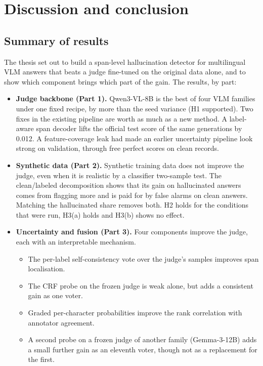 \chapter{Discussion and conclusion}\label{chap:conclusion}

\section{Summary of results}

The thesis set out to build a span-level hallucination detector for multilingual VLM answers that beats a judge fine-tuned on the original data alone, and to show which component brings which part of the gain. The results, by part:

\begin{itemize}
    \item \textbf{Judge backbone (Part 1).} Qwen3-VL-8B is the best of four VLM families under one fixed recipe, by more than the seed variance (H1 supported). Two fixes in the existing pipeline are worth as much as a new method. A label-aware span decoder lifts the official test score of the same generations by 0.012. A feature-coverage leak had made an earlier uncertainty pipeline look strong on validation, through free perfect scores on clean records.
    \item \textbf{Synthetic data (Part 2).} Synthetic training data does not improve the judge, even when it is realistic by a classifier two-sample test. The clean/labeled decomposition shows that its gain on hallucinated answers comes from flagging more and is paid for by false alarms on clean answers. Matching the hallucinated share removes both. H2 holds for the conditions that were run, H3(a) holds and H3(b) shows no effect.
    \item \textbf{Uncertainty and fusion (Part 3).} Four components improve the judge, each with an interpretable mechanism.
    \begin{itemize}
        \item The per-label self-consistency vote over the judge's samples improves span localisation.
        \item The CRF probe on the frozen judge is weak alone, but adds a consistent gain as one voter.
        \item Graded per-character probabilities improve the rank correlation with annotator agreement.
        \item A second probe on a frozen judge of another family (Gemma-3-12B) adds a small further gain as an eleventh voter, though not as a replacement for the first.

\end{itemize}
\end{itemize}
